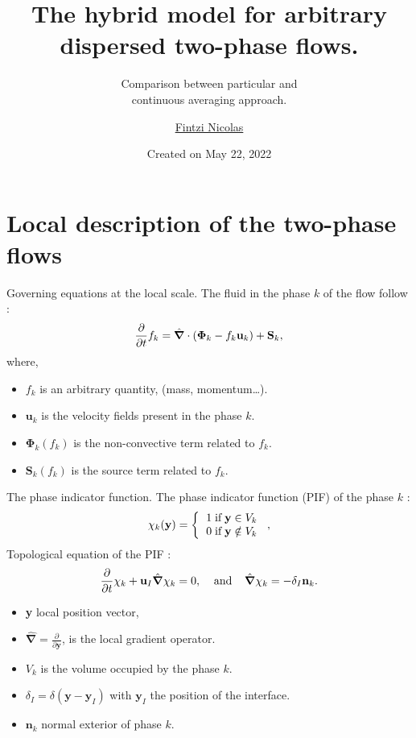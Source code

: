 \documentclass{sintefbeamer}
\title{The hybrid model for arbitrary dispersed two-phase flows.}
\subtitle{Comparison between particular and \\continuous averaging approach.}
\author{\href{mailto:qilong-kirov.liu@connect.polyu.hk}{Fintzi Nicolas}}
\date{Created on May 22, 2022}
\newcommand{\nablabh}{\hat{\bm{\nabla}}}
\begin{document}
\maketitle

\section{Local description of the two-phase flows}

\begin{frame}{Governing equations at the local scale.}
  The fluid in the phase $k$ of the flow follow :
  \begin{equation}
    \pddt f_k
    = \nablabh \cdot \left(
        \bm{\Phi}_k
        - f_k\textbf{u}_k
        \right)
    + \textbf{S}_k,
    \label{eq:general_conservation}
\end{equation}
where,
\begin{itemize}
  \item $f_k$ is an arbitrary quantity, (mass, momentum\ldots).
  \item $\textbf{u}_k$ is the velocity fields present in the phase $k$. 
  \item $\bm{\Phi}_k(f_k)$ is the non-convective term related to $f_k$.
  \item $\textbf{S}_k(f_k)$ is the source term related to $f_k$.
\end{itemize}
\end{frame}

\begin{frame}{The phase indicator function.}
  The phase indicator function (PIF) of the phase $k$ :
  \begin{equation}
    \chi_k(\textbf{y}) =  \left\{
      \begin{tabular}{cc}
        $1 \;\text{if} \;\textbf{y} \in V_k$\\
        $0 \;\text{if} \;\textbf{y} \notin V_k$
      \end{tabular}
      \right.,
      \label{eq:phase_indicator}
\end{equation}
Topological equation of the PIF :
\begin{equation}
  \pddt \chi_k
  + \textbf{u}_I  \nablabh \chi_k 
  = 0, \;\;\;\;\text{and}\;\;\;\;
    \nablabh \chi_k 
    = - \delta_I \textbf{n}_k.
  \label{eq:phaseindicator_transport}
\end{equation}

\begin{itemize}
  \item \textbf{y} local position vector,
  \item $\nablabh = \frac{\partial}{\partial \textbf{y}}$, is the local gradient operator.
  \item  $V_k$ is the volume occupied by the phase $k$.
  \item $\delta_I = \delta(\textbf{y} - \textbf{y}_I)$ with $\textbf{y}_I$ the position of the interface.
  \item $\textbf{n}_k$ normal exterior of phase $k$.
\end{itemize}
\end{frame}
\end{document}
